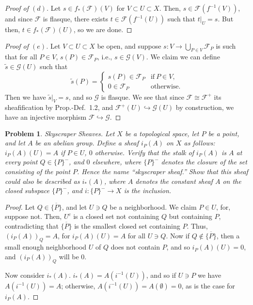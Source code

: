\documentclass[12pt,letterpaper]{article}
\newtheorem{problem}{Problem}[section]
\theoremstyle{definition}
\theoremstyle{remark}
\numberwithin{equation}{section}
\numberwithin{figure}{problem}
\begin{document}
\begin{proof}[Proof of $(d)$]
  Let $s \in f_*(\mathscr{F})(V)$ for $V \subset U \subset X$. Then, $s \in \mathscr{F}(f^{-1}(V))$, and since $\mathscr{F}$ is flasque, there exists $t \in \mathscr{F}(f^{-1}(U))$ such that $t\vert_U = s$. But then, $t \in f_*(\mathscr{F})(U)$, so we are done.
\end{proof}
\begin{proof}[Proof of $(e)$]
  Let $V \subset U \subset X$ be open, and suppose $s\colon V \to \bigcup_{P \in V} \mathscr{F}_P$ is such that for all $P \in V$, $s(P) \in \mathscr{F}_P$, i.e., $s \in \mathscr{G}(V)$. We claim we can define $\tilde{s} \in \mathscr{G}(U)$ such that
  \begin{equation*}
    \tilde{s}(P) = \begin{cases}
      s(P) \in \mathscr{F}_P & \text{if}~P \in V,\\
      0 \in \mathscr{F}_P & \text{otherwise}.
    \end{cases}
  \end{equation*}
  Then we have $\tilde{s}\vert_V = s$, and so $\mathscr{G}$ is flasque. We see that since $\mathscr{F} \cong \mathscr{F}^+$ its sheafification by Prop.-Def.~1.2, and $\mathscr{F}^+(U) \hookrightarrow \mathscr{G}(U)$ by construction, we have an injective morphism $\mathscr{F} \hookrightarrow \mathscr{G}$.
\end{proof}

\begin{problem}
  \emph{Skyscraper Sheaves}. Let $X$ be a topological space, let $P$ be a point, and let $A$ be an abelian group. Define a sheaf $i_P(A)$ on $X$ as follows: $i_P(A)(U) = A$ if $P \in U$, $0$ otherwise. Verify that the stalk of $i_P(A)$ is $A$ at every point $Q \in \{P\}^-$, and $0$ elsewhere, where $\{P\}^-$ denotes the closure of the set consisting of the point $P$. Hence the name ``skyscraper sheaf.'' Show that this sheaf could also be described as $i_*(A)$, where $A$ denotes the constant sheaf $A$ on the closed subspace $\{P\}^-$, and $i\colon\{P\}^- \to X$ is the inclusion.
\end{problem}
\begin{proof}
  Let $Q \in \overline{\{P\}}$, and let $U \ni Q$ be a neighborhood. We claim $P \in U$, for, suppose not. Then, $U^c$ is a closed set not containing $Q$ but containing $P$, contradicting that $\overline{\{P\}}$ is the smallest closed set containing $P$. Thus, $(i_P(A))_Q = A$, for $i_P(A)(U) = A$ for all $U \ni Q$. Now if $Q \notin \overline{\{P\}}$, then a small enough neighborhood $U$ of $Q$ does not contain $P$, and so $i_P(A)(U) = 0$, and $(i_P(A))_Q$ will be $0$.
  \par Now consider $i_*(A)$. $i_*(A) = A(i^{-1}(U))$, and so if $U \ni P$ we have $A(i^{-1}(U)) = A$; otherwise, $A(i^{-1}(U)) = A(\emptyset) = 0$, as is the case for $i_P(A)$.
\end{proof}
\end{document}
